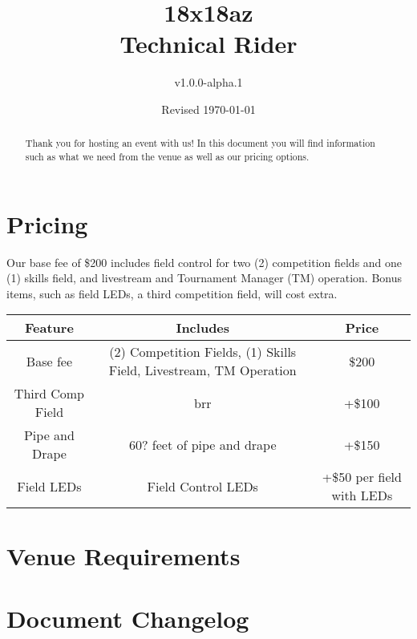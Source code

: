 \documentclass{article}
\title{18x18az\\Technical Rider}
\author{v1.0.0-alpha.1}
\date{Revised \today}
\begin{document}
\maketitle
\begin{abstract}
Thank you for hosting an event with us! In this document you will find information such as what we need from the venue as well as our pricing options.
\end{abstract}
\tableofcontents
\section{Pricing}
Our base fee of \$200 includes field control for two (2) competition fields and one (1) skills field, and livestream and Tournament Manager (TM) operation.
Bonus items, such as field LEDs, a third competition field, will cost extra.

\begin{tabular}{|c|c|c|}
    \hline
    Feature & Includes & Price \\
    \hline
    Base fee & (2) Competition Fields, (1) Skills Field, Livestream, TM Operation & \$200 \\
    \hline
    Third Comp Field & brr & +\$100 \\
    Pipe and Drape & 60? feet of pipe and drape & +\$150 \\
    Field LEDs & Field Control LEDs & +\$50 per field with LEDs \\
    \hline
\end{tabular}
\section{Venue Requirements}
\section{Document Changelog}
\end{document}
